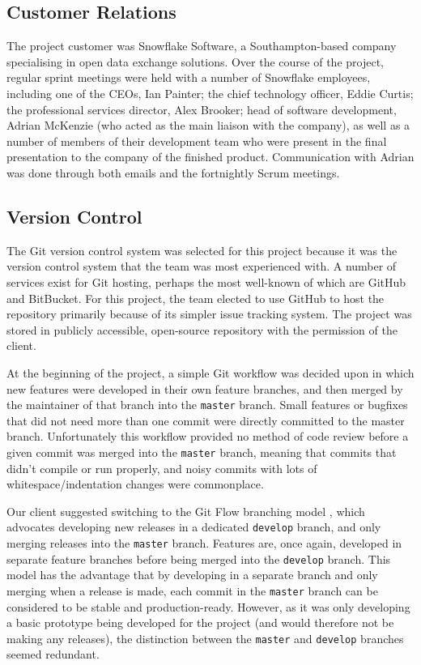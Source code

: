 \documentclass[a4paper, 12pt, twoside]{article}
\begin{document}
\subsection{Customer Relations}
\label{sec:plan_customer_relations}

The project customer was Snowflake Software, a Southampton-based company specialising in open data exchange solutions. Over the course of the project, regular sprint meetings were held with a number of Snowflake employees, including one of the CEOs, Ian Painter; the chief technology officer, Eddie Curtis; the professional services director, Alex Brooker; head of software development, Adrian McKenzie (who acted as the main liaison with the company), as well as a number of members of their development team who were present in the final presentation to the company of the finished product. Communication with Adrian was done through both emails and the fortnightly Scrum meetings.

\subsection{Version Control}
\label{sec:version_control}

The Git version control system was selected for this project because it was the version control system that the team was most experienced with. A number of services exist for Git hosting, perhaps the most well-known of which are GitHub and BitBucket. For this project, the team elected to use GitHub to host the repository primarily because of its simpler issue tracking system. The project was stored in publicly accessible, open-source repository with the permission of the client.

At the beginning of the project, a simple Git workflow was decided upon in which new features were developed in their own feature branches, and then merged by the maintainer of that branch into the \texttt{master} branch. Small features or bugfixes that did not need more than one commit were directly committed to the master branch. Unfortunately this workflow provided no method of code review before a given commit was merged into the \texttt{master} branch, meaning that commits that didn't compile or run properly, and noisy commits with lots of whitespace/indentation changes were commonplace.

Our client suggested switching to the Git Flow branching model \cite{Driessen2010}, which advocates developing new releases in a dedicated \texttt{develop} branch, and only merging releases into the \texttt{master} branch. Features are, once again, developed in separate feature branches before being merged into the \texttt{develop} branch. This model has the advantage that by developing in a separate branch and only merging when a release is made, each commit in the \texttt{master} branch can be considered to be stable and production-ready. However, as it was only developing a basic prototype being developed for the project (and would therefore not be making any releases), the distinction between the \texttt{master} and \texttt{develop} branches seemed redundant.
\end{document}
